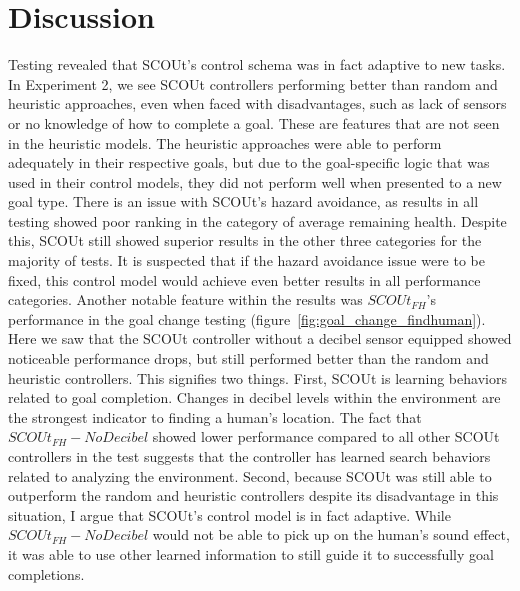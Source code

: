 \section{Discussion}
Testing revealed that SCOUt's control schema was in fact adaptive to new tasks.
In Experiment 2, we see SCOUt controllers performing better than random and heuristic approaches, even when faced with disadvantages, such as lack of sensors or no knowledge of how to complete a goal.
These are features that are not seen in the heuristic models.
The heuristic approaches were able to perform adequately in their respective goals, but due to the goal-specific logic that was used in their control models, they did not perform well when presented to a new goal type.
There is an issue with SCOUt's hazard avoidance, as results in all testing showed poor ranking in the category of average remaining health.
Despite this, SCOUt still showed superior results in the other three categories for the majority of tests.
It is suspected that if the hazard avoidance issue were to be fixed, this control model would achieve even better results in all performance categories.
Another notable feature within the results was $SCOUt_{FH}$'s performance in the goal change testing (figure~\ref{fig:goal_change_findhuman}).
Here we saw that the SCOUt controller without a decibel sensor equipped showed noticeable performance drops, but still performed better than the random and heuristic controllers.
This signifies two things.
First, SCOUt is learning behaviors related to goal completion.
Changes in decibel levels within the environment are the strongest indicator to finding a human's location.
The fact that $SCOUt_{FH} - No Decibel$ showed lower performance compared to all other SCOUt controllers in the test suggests that the controller has learned search behaviors related to analyzing the environment.
Second, because SCOUt was still able to outperform the random and heuristic controllers despite its disadvantage in this situation, I argue that SCOUt's control model is in fact adaptive.
While $SCOUt_{FH} - No Decibel$ would not be able to pick up on the human's sound effect, it was able to use other learned information to still guide it to successfully goal completions.
